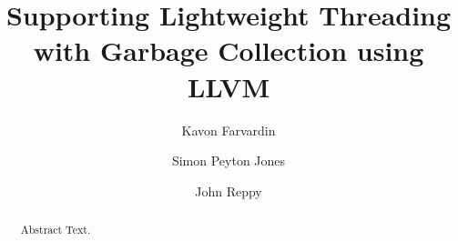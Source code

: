 \documentclass[sigplan, review, nonacm]{acmart}
\begin{document}
\title{Supporting Lightweight Threading with Garbage Collection using LLVM}

\author{Kavon Farvardin}

\author{Simon Peyton Jones}

\author{John Reppy}



\begin{abstract}
Abstract Text.
\end{abstract}



\maketitle



% 
% 
\end{document}
